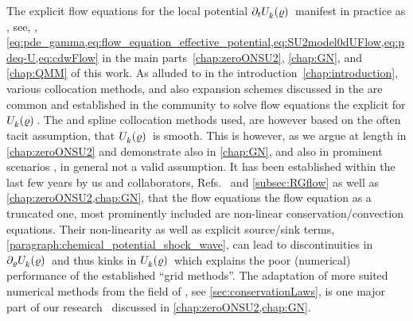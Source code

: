 The explicit flow equations for the local potential $\partial_t \Ukrho{}$ manifest in practice as \pdes{}, see, \eg{}, \cref{eq:pde_gamma,eq:flow_equation_effective_potential,eq:SU2model0dUFlow,eq:pdeq-U,eq:cdwFlow} in the main parts~\ref{chap:zeroONSU2}, \ref{chap:GN}, and \ref{chap:QMM} of this work.
As alluded to in the introduction~\ref{chap:introduction}, various collocation methods, \cf{} \ccite{\frgFDReferences,\frgSplineReferences} and also expansion schemes discussed in the  are common and established in the \frg{} community to solve \lpa{} flow equations \dash{} the explicit \pdes{} for $\Ukrho{}$.
The \fd{} and spline collocation methods used, are however based on the often tacit assumption, that $\Ukrho{}$ is smooth.
This is however, as we argue at length in \cref{chap:zeroONSU2} and demonstrate also in \cref{chap:GN}, \apriori{} and also in prominent scenarios \aposteriori{}, in general not a valid assumption.
It has been established within the last few years by us and collaborators, \cf{} Refs.~\cite{Grossi:2019urj,zerod1,zerod2,zerod3,Ihssen2020,Grossi:2021ksl,Stoll:2021ori,Ihssen:2022xkr,Ihssen:2023xlp} and \cref{subsec:RGflow} as well as \cref{chap:zeroONSU2,chap:GN}, that the \frg{} flow equations \dash{} the \lpa{} flow equation as a truncated one, most prominently included \dash{} are non-linear conservation/convection equations.
Their non-linearity as well as explicit source/sink terms, \cf{} \cref{paragraph:chemical_potential_shock_wave}, can lead to discontinuities in $\partial_\MFrho \Ukrho{}$ and thus kinks in $\Ukrho{}$ which explains the poor (numerical) performance of the established ``grid methods''.
The adaptation of more suited numerical methods from the field of \cfd{}, see \cref{sec:conservationLaws}, is one major part of our research~\cite{zerod1,zerod2,zerod3,zerod4,Stoll:2021ori} discussed in \cref{chap:zeroONSU2,chap:GN}.\bigskip

